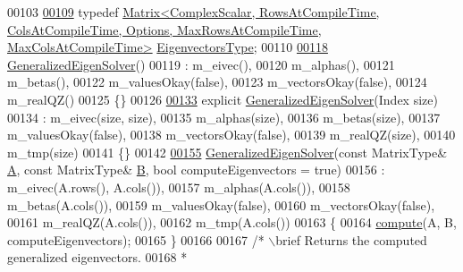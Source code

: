 \begin{DoxyCode}
00103 
\hyperlink{group___eigenvalues___module_afffec018dbb2d87b4c09b6acecbb79cd}{00109}     \textcolor{keyword}{typedef} 
      \hyperlink{group___core___module}{Matrix<ComplexScalar, RowsAtCompileTime, ColsAtCompileTime, Options, MaxRowsAtCompileTime,
       MaxColsAtCompileTime>}
       \hyperlink{group___eigenvalues___module_afffec018dbb2d87b4c09b6acecbb79cd}{EigenvectorsType};
00110 
\hyperlink{group___eigenvalues___module_ae745f39da43f9df192cc2875d82b4cf1}{00118}     \hyperlink{group___eigenvalues___module_ae745f39da43f9df192cc2875d82b4cf1}{GeneralizedEigenSolver}()
00119       : m\_eivec(),
00120         m\_alphas(),
00121         m\_betas(),
00122         m\_valuesOkay(false),
00123         m\_vectorsOkay(false),
00124         m\_realQZ()
00125     \{\}
00126 
\hyperlink{group___eigenvalues___module_aab6423ded30275cd4cdd31758c278694}{00133}     \textcolor{keyword}{explicit} \hyperlink{group___eigenvalues___module_aab6423ded30275cd4cdd31758c278694}{GeneralizedEigenSolver}(Index size)
00134       : m\_eivec(size, size),
00135         m\_alphas(size),
00136         m\_betas(size),
00137         m\_valuesOkay(false),
00138         m\_vectorsOkay(false),
00139         m\_realQZ(size),
00140         m\_tmp(size)
00141     \{\}
00142 
\hyperlink{group___eigenvalues___module_a2a3528cbf75f66d3a60af9dc7b12ff65}{00155}     \hyperlink{group___eigenvalues___module_a2a3528cbf75f66d3a60af9dc7b12ff65}{GeneralizedEigenSolver}(\textcolor{keyword}{const} MatrixType& \hyperlink{group___core___module_class_eigen_1_1_matrix}{A}, \textcolor{keyword}{const} MatrixType& 
      \hyperlink{group___core___module_class_eigen_1_1_matrix}{B}, \textcolor{keywordtype}{bool} computeEigenvectors = \textcolor{keyword}{true})
00156       : m\_eivec(A.rows(), A.cols()),
00157         m\_alphas(A.cols()),
00158         m\_betas(A.cols()),
00159         m\_valuesOkay(false),
00160         m\_vectorsOkay(false),
00161         m\_realQZ(A.cols()),
00162         m\_tmp(A.cols())
00163     \{
00164       \hyperlink{group___eigenvalues___module_a275910b47dfe5f40211dcb59cfd68f3c}{compute}(A, B, computeEigenvectors);
00165     \}
00166 
00167     \textcolor{comment}{/* \(\backslash\)brief Returns the computed generalized eigenvectors.}
00168 \textcolor{comment}{      *}

\end{DoxyCode}
